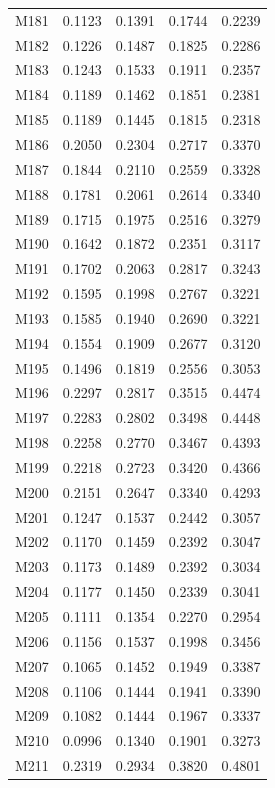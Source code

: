 \begin{longtable}{lrrrr}
M181 & 0.1123 & 0.1391 & 0.1744 & 0.2239 \\
M182 & 0.1226 & 0.1487 & 0.1825 & 0.2286 \\
M183 & 0.1243 & 0.1533 & 0.1911 & 0.2357 \\
M184 & 0.1189 & 0.1462 & 0.1851 & 0.2381 \\
M185 & 0.1189 & 0.1445 & 0.1815 & 0.2318 \\
M186 & 0.2050 & 0.2304 & 0.2717 & 0.3370 \\
M187 & 0.1844 & 0.2110 & 0.2559 & 0.3328 \\
M188 & 0.1781 & 0.2061 & 0.2614 & 0.3340 \\
M189 & 0.1715 & 0.1975 & 0.2516 & 0.3279 \\
M190 & 0.1642 & 0.1872 & 0.2351 & 0.3117 \\
M191 & 0.1702 & 0.2063 & 0.2817 & 0.3243 \\
M192 & 0.1595 & 0.1998 & 0.2767 & 0.3221 \\
M193 & 0.1585 & 0.1940 & 0.2690 & 0.3221 \\
M194 & 0.1554 & 0.1909 & 0.2677 & 0.3120 \\
M195 & 0.1496 & 0.1819 & 0.2556 & 0.3053 \\
M196 & 0.2297 & 0.2817 & 0.3515 & 0.4474 \\
M197 & 0.2283 & 0.2802 & 0.3498 & 0.4448 \\
M198 & 0.2258 & 0.2770 & 0.3467 & 0.4393 \\
M199 & 0.2218 & 0.2723 & 0.3420 & 0.4366 \\
M200 & 0.2151 & 0.2647 & 0.3340 & 0.4293 \\
M201 & 0.1247 & 0.1537 & 0.2442 & 0.3057 \\
M202 & 0.1170 & 0.1459 & 0.2392 & 0.3047 \\
M203 & 0.1173 & 0.1489 & 0.2392 & 0.3034 \\
M204 & 0.1177 & 0.1450 & 0.2339 & 0.3041 \\
M205 & 0.1111 & 0.1354 & 0.2270 & 0.2954 \\
M206 & 0.1156 & 0.1537 & 0.1998 & 0.3456 \\
M207 & 0.1065 & 0.1452 & 0.1949 & 0.3387 \\
M208 & 0.1106 & 0.1444 & 0.1941 & 0.3390 \\
M209 & 0.1082 & 0.1444 & 0.1967 & 0.3337 \\
M210 & 0.0996 & 0.1340 & 0.1901 & 0.3273 \\
M211 & 0.2319 & 0.2934 & 0.3820 & 0.4801 \\

\end{longtable}
